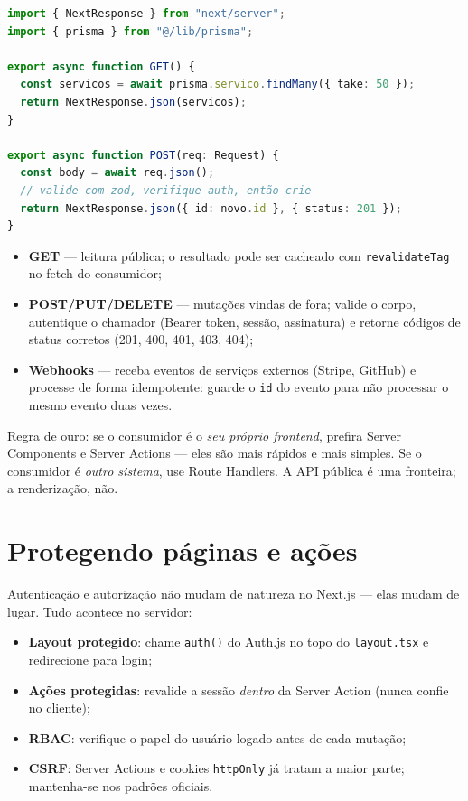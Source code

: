 \begin{lstlisting}[style=livro, language=TypeScript,
  caption={Route Handler com validação e status HTTP.}, label={list:fullstack-route}]
import { NextResponse } from "next/server";
import { prisma } from "@/lib/prisma";

export async function GET() {
  const servicos = await prisma.servico.findMany({ take: 50 });
  return NextResponse.json(servicos);
}

export async function POST(req: Request) {
  const body = await req.json();
  // valide com zod, verifique auth, então crie
  return NextResponse.json({ id: novo.id }, { status: 201 });
}
\end{lstlisting}

\begin{itemize}[leftmargin=*, itemsep=0.4em]
  \item \textbf{GET} — leitura pública; o resultado pode ser cacheado com
  \texttt{revalidateTag} no fetch do consumidor;
  \item \textbf{POST/PUT/DELETE} — mutações vindas de fora; valide o corpo,
  autentique o chamador (Bearer token, sessão, assinatura) e retorne códigos
  de status corretos (201, 400, 401, 403, 404);
  \item \textbf{Webhooks} — receba eventos de serviços externos (Stripe,
  GitHub) e processe de forma idempotente: guarde o \texttt{id} do evento para
  não processar o mesmo evento duas vezes.
\end{itemize}

\begin{caixadica}
Regra de ouro: se o consumidor é o \emph{seu próprio frontend}, prefira Server
Components e Server Actions — eles são mais rápidos e mais simples. Se o
consumidor é \emph{outro sistema}, use Route Handlers. A API pública é uma
fronteira; a renderização, não.
\end{caixadica}

\section{Protegendo páginas e ações}

Autenticação e autorização não mudam de natureza no Next.js — elas mudam de
lugar. Tudo acontece no servidor:

\begin{itemize}[leftmargin=*, itemsep=0.4em]
  \item \textbf{Layout protegido}: chame \texttt{auth()} do Auth.js no topo do \texttt{layout.tsx} e redirecione para login;
  \item \textbf{Ações protegidas}: revalide a sessão \emph{dentro} da Server Action (nunca confie no cliente);
  \item \textbf{RBAC}: verifique o papel do usuário logado antes de cada mutação;
  \item \textbf{CSRF}: Server Actions e cookies \texttt{httpOnly} já tratam a maior parte; mantenha-se nos padrões oficiais.
\end{itemize}

